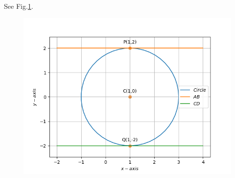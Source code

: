 \documentclass[12pt]{article}
\begin{document}
See Fig.\ref{fig:Fig1}.
\begin{figure}[!h]
	\begin{center} 
	    \includegraphics[width=\columnwidth]{figs/tan1}
	\end{center}
\caption{}
\label{fig:Fig1}
\end{figure}
\end{document}
